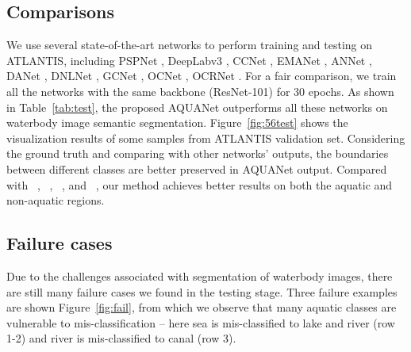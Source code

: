 \documentclass{article}
\begin{document}
\subsection{Comparisons}
We use several state-of-the-art networks to perform training and testing on ATLANTIS, including PSPNet \cite{zhao2017pyramid}, DeepLabv3 \cite{chen2017rethinking}, CCNet \cite{huang2019ccnet}, EMANet \cite{li2019expectation}, ANNet \cite{zhu2019asymmetric}, DANet \cite{fu2019dual}, DNLNet \cite{yin2020disentangled}, GCNet \cite{cao2019gcnet}, OCNet \cite{YuanW18}, OCRNet \cite{yuan2019object}. 
For a fair comparison, we train all the networks with the same backbone (ResNet-101) for 30 epochs.
As shown in Table~\ref{tab:test}, the proposed AQUANet outperforms all these networks on waterbody image 
semantic segmentation.
Figure~\ref{fig:56test} shows the visualization results of some samples from ATLANTIS validation set. Considering the ground truth and comparing with other networks' outputs, the boundaries between different classes are better preserved in AQUANet output.
Compared with \citeauthor{chen2017rethinking}~\cite{chen2017rethinking}, \citeauthor{zhao2017pyramid}~\cite{zhao2017pyramid}, \citeauthor{fu2019dual}~\cite{fu2019dual}, and \citeauthor{YuanW18}~\cite{YuanW18}, 
our method achieves better results on both the aquatic and non-aquatic regions. 

\subsection{Failure cases}
Due to the challenges associated with segmentation of waterbody images, there are still many failure cases we found in the testing stage.
Three failure examples are shown Figure~\ref{fig:fail}, from which we observe that many aquatic classes are vulnerable to mis-classification -- here sea is mis-classified to lake and river (row 1-2) and river is mis-classified to canal (row 3).
\end{document}
